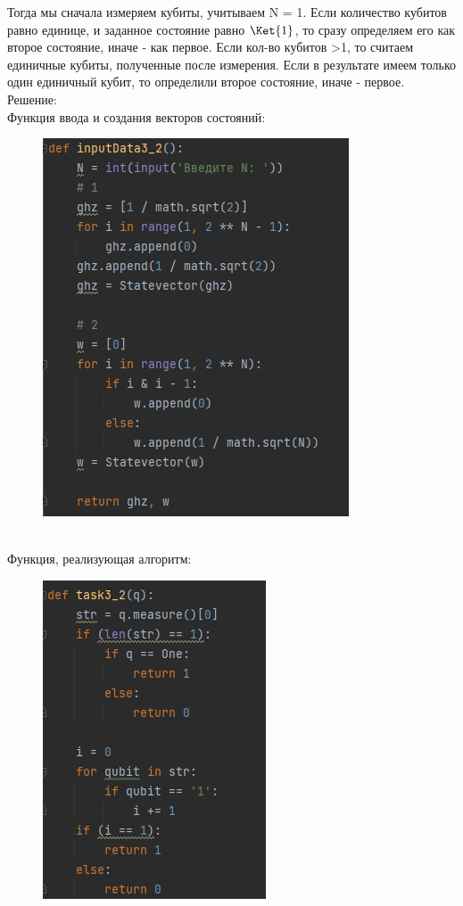 \documentclass{article}
\begin{document}
Тогда мы сначала измеряем кубиты, учитываем N = 1. Если количество кубитов равно единице, и заданное состояние равно $\Ket{1}$, то сразу определяем его как второе состояние, иначе - как первое. Если кол-во кубитов >1, то считаем единичные кубиты, полученные после измерения. Если в результате имеем только один единичный кубит, то определили второе состояние, иначе - первое.\\
Решение:\\
Функция ввода и создания векторов состояний: \\
\begin{figure}[h]
        \centering
        \includegraphics{pictures/input3.2.png}
   \end{figure}\\
Функция, реализующая алгоритм: \\
\begin{figure}[h]
        \centering
        \includegraphics{pictures/task3.2.png}
   \end{figure}\\ \\ \\ \\ 
\end{document}
